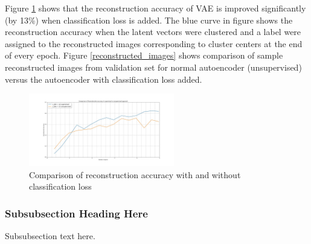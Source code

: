 \documentclass[journal]{IEEEtran}
\begin{document}
Figure \ref{reconstruction_accuracy_sup_vs_unsup} shows that the reconstruction accuracy of VAE is improved significantly  (by 13\%) when classification loss is added. The blue curve in figure shows the reconstruction accuracy when the latent vectors were clustered and a label were assigned to the reconstructed images corresponding to  cluster centers at the end of every epoch. Figure \ref{reconstructed_images} shows comparison of sample reconstructed images from validation set for normal autoencoder (unsupervised) versus the autoencoder with classification loss added.

\begin{figure}[!t]
\centering
\includegraphics[width=2.5in]{reconstruction_accuracy_compare_supervised_vs_unsuprevised.jpg}
\caption{Comparison of reconstruction accuracy with and without classification loss }
\label{reconstruction_accuracy_sup_vs_unsup}
\end{figure}




\subsubsection{Subsubsection Heading Here}
Subsubsection text here.


%
%
\end{document}

